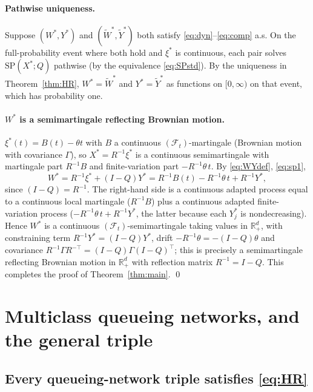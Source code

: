 \documentclass{amsart}
\theoremstyle{definition}
\theoremstyle{remark}
\newcommand{\R}{\mathbb{R}}
\begin{document}
\paragraph{Pathwise uniqueness.}
Suppose $(W^\ast,Y^\ast)$ and $(\widetilde W^\ast,\widetilde Y^\ast)$ both
satisfy \eqref{eq:dyn}--\eqref{eq:comp} a.s. On the full-probability event where
both hold and $\xi^\ast$ is continuous, each pair solves
$\mathrm{SP}(X^\ast;Q)$ pathwise (by the equivalence \eqref{eq:SPstd}). By the
uniqueness in Theorem~\ref{thm:HR}, $W^\ast=\widetilde W^\ast$ and
$Y^\ast=\widetilde Y^\ast$ as functions on $[0,\infty)$ on that event, which has
probability one.

\paragraph{$W^\ast$ is a semimartingale reflecting Brownian motion.}
$\xi^\ast(t)=B(t)-\theta t$ with $B$ a continuous $(\mathcal F_t)$-martingale
(Brownian motion with covariance $\Gamma$), so $X^\ast=R^{-1}\xi^\ast$ is a
continuous semimartingale with martingale part $R^{-1}B$ and finite-variation
part $-R^{-1}\theta\,t$. By \eqref{eq:WYdef}, \eqref{eq:sp1},
\[
  W^\ast=R^{-1}\xi^\ast+(I-Q)Y^\ast
       = R^{-1}B(t)-R^{-1}\theta\,t+R^{-1}Y^\ast,
\]
since $(I-Q)=R^{-1}$. The right-hand side is a continuous adapted process equal
to a continuous local martingale ($R^{-1}B$) plus a continuous adapted
finite-variation process ($-R^{-1}\theta\,t+R^{-1}Y^\ast$, the latter because
each $Y^\ast_j$ is nondecreasing). Hence $W^\ast$ is a continuous
$(\mathcal F_t)$-semimartingale taking values in $\R_+^d$, with constraining
term $R^{-1}Y^\ast=(I-Q)Y^\ast$, drift $-R^{-1}\theta=-(I-Q)\theta$ and
covariance $R^{-1}\Gamma R^{-\top}=(I-Q)\Gamma(I-Q)^\top$; this is precisely a
semimartingale reflecting Brownian motion in $\R_+^d$ with reflection matrix
$R^{-1}=I-Q$. This completes the proof of Theorem~\ref{thm:main}.
\qed

\section{Multiclass queueing networks, and the general triple}

\subsection{Every queueing-network triple satisfies \eqref{eq:HR}}
\end{document}
